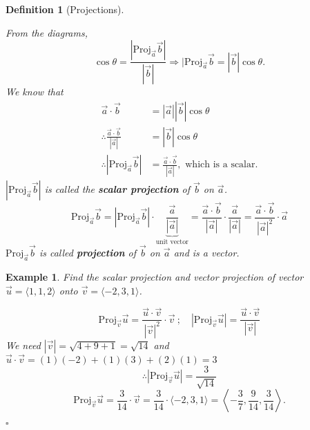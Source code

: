 \documentclass[12pt,a4paper]{article}
\newtheorem{df}{Definition}[subsection]
\newtheorem{eg}{Example}[subsection]
\newenvironment*{ans}{\par\indent{\textit{Answer. }}\par}{\par\hfill{$\square$}\par}
\def\Proj{\mathrm{Proj}}
\def\vecv{\vec{v}}
\def\vecu{\vec{u}}
\def\veca{\vec{a}}
\def\vecb{\vec{b}}
\begin{document}
\begin{df}[Projections]
\begin{center}
	\end{center}
	From the diagrams, \[\cos\theta=\frac{|\Proj_{\veca}\vecb|}{|\vecb|}\Longrightarrow|\Proj_{\veca}\vecb=\boxed{|\vecb|\cos\theta}.\]
	We know that \[\begin{aligned}
		\veca\cdot\vecb&=|\veca||\vecb|\cos\theta\\
		\therefore\frac{\veca\cdot\vecb}{|\veca|}&=\boxed{|\vecb|\cos\theta}\\
		\therefore |\Proj_{\veca}\vecb|&=\frac{\veca\cdot\vecb}{|\veca|},\text{ which is a scalar.}
	\end{aligned}\]
	$|\Proj_{\veca}\vecb|$ is called the \textbf{scalar projection} of $\vecb$ on $\veca$.
	\[\Proj_{\veca}\vecb=|\Proj_{\veca}\vecb|\cdot\underbrace{\frac{\veca}{|\veca|}}_{\text{unit vector}}=\frac{\veca\cdot\vecb}{|\veca|}\cdot\frac{\veca}{|\veca|}=\frac{\veca\cdot\vecb}{|\veca|^2}\cdot\veca\]
	$\Proj_{\veca}\vecb$ is called \textbf{projection} of $\vecb$ on $\veca$ and is a vector. 
\end{df}
\begin{eg}
	Find the scalar projection and vector projection of vector $\vecu=\langle1,1,2\rangle$ onto $\vecv=\langle-2,3,1\rangle$.
	\begin{ans}
		\[\Proj_{\vecv}\vecu=\frac{\vecu\cdot\vecv}{|\vecv|^2}\cdot\vecv\ ;\quad |\Proj_{\vecv}\vecu|=\frac{\vecu\cdot\vecv}{|\vecv|}\]
		We need $|\vecv|=\sqrt{4+9+1}=\sqrt{14}$ and $\vecu\cdot\vecv=(1)(-2)+(1)(3)+(2)(1)=3$
		\[\therefore |\Proj_{\vecv}\vecu|=\frac{3}{\sqrt{14}}\]
		\[\Proj_{\vecv}\vecu=\frac{3}{14}\cdot\vecv=\frac{3}{14}\cdot\langle-2,3,1\rangle=\left\langle-\frac{3}{7},\frac{9}{14},\frac{3}{14}\right\rangle.\]
	\end{ans}
\end{eg}
\end{document}
